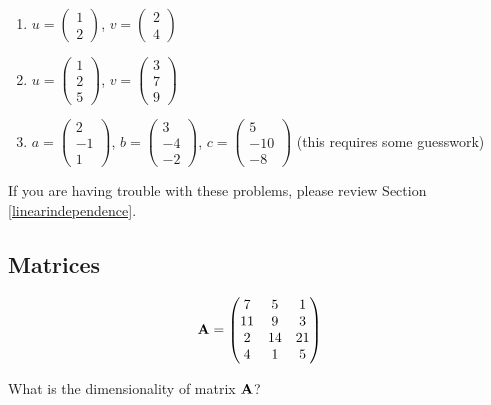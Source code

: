 \documentclass[
]{book}
\theoremstyle{definition}
\theoremstyle{definition}
\theoremstyle{definition}
\theoremstyle{remark}
\begin{document}
\begin{enumerate}
\def\labelenumi{\arabic{enumi}.}
\item
  \(u = \begin{pmatrix} 1\\ 2\end{pmatrix}\), \(v = \begin{pmatrix} 2\\4\end{pmatrix}\)
\item
  \(u = \begin{pmatrix} 1\\ 2\\ 5 \end{pmatrix}\), \(v = \begin{pmatrix} 3\\ 7\\ 9 \end{pmatrix}\)
\item
  \(a = \begin{pmatrix} 2\\ -1\\ 1 \end{pmatrix}\), \(b = \begin{pmatrix} 3\\ -4\\ -2 \end{pmatrix}\), \(c = \begin{pmatrix} 5\\ -10\\ -8 \end{pmatrix}\) (this requires some guesswork)
\end{enumerate}

If you are having trouble with these problems, please review Section \ref{linearindependence}.

\hypertarget{matrices}{%
\subsection*{Matrices}\label{matrices}}

\[{\bf A}=\begin{pmatrix}
            7 & 5 & 1 \\
            11 & 9 & 3 \\ 
            2 & 14 & 21 \\ 
            4 & 1 & 5
        \end{pmatrix}\]

What is the dimensionality of matrix \({\bf A}\)?
\end{document}
